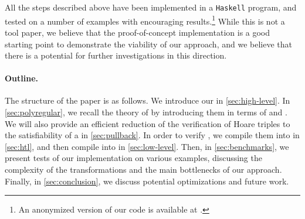 All the steps described above have been implemented in a \texttt{Haskell}
program, and tested on a number of examples with encouraging
results.\footnote{An anonymized version of our code is available at
\repositoryUrl.} While this is not a tool paper, we believe that the
proof-of-concept implementation is a good starting point to demonstrate the viability of
our approach, and we believe that there is a potential for further
investigations in this direction.


\paragraph{Outline.} The structure of the paper is as follows. We introduce our
 in \cref{sec:high-level}. In \cref{sec:polyregular},
we recall the theory of  by introducing them in terms
of  and . We will also
provide an efficient reduction of the verification of Hoare triples to the
satisfiability of a  in \cref{sec:pullback}.
In order to verify , we compile them into  in \cref{sec:htl}, and then compile  into
 in \cref{sec:low-level}. 
%
Then, in \cref{sec:benchmarks}, we present
tests of our implementation on various examples, discussing
the complexity of the transformations and the main bottlenecks of our approach.
Finally, in \cref{sec:conclusion}, we discuss potential
optimizations and future work.

